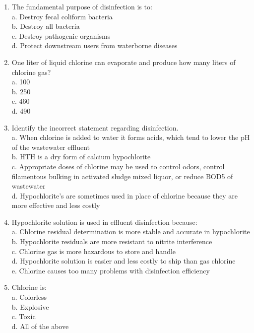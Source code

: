 \begin{tcolorbox}[breakable, enhanced,
colframe=blue!25,
colback=blue!10,
coltitle=blue!20!black,  
title= Chapter Assessment]
\begin{enumerate}
b. rotameter readings. \\
c. weighing of the cylinder or tank \\
d. the chlorine residual test . \\
e. None of the above. \\
\item The fundamental purpose of disinfection is to: \\
a. Destroy fecal coliform bacteria \\
b. Destroy all bacteria \\
c. Destroy pathogenic organisms \\
d. Protect downstream users from waterborne diseases \\
\item One liter of liquid chlorine can evaporate and produce how many liters of chlorine gas? \\
a. 100 \\
b. 250 \\
c. 460 \\
d. 490 \\
\item Identify the incorrect statement regarding disinfection. \\
a. When chlorine is added to water it forms acids, which tend to lower the pH of the wastewater effluent \\
b. HTH is a dry form of calcium hypochlorite \\
c. Appropriate doses of chlorine may be used to control odors, control filamentous bulking in activated sludge mixed liquor, or reduce BOD5 of wastewater \\
d. Hypochlorite’s are sometimes used in place of chlorine because they are more effective and less costly \\
\item Hypochlorite solution is used in effluent disinfection because: \\
a. Chlorine residual determination is more stable and accurate in hypochlorite \\
b. Hypochlorite residuals are more resistant to nitrite interference \\
c. Chlorine gas is more hazardous to store and handle \\
d. Hypochlorite solution is easier and less costly to ship than gas chlorine \\
e. Chlorine causes too many problems with disinfection efficiency \\
\item Chlorine is: \\
a. Colorless \\
b. Explosive \\
c. Toxic \\
d. All of the above \\
\end{enumerate}
\end{tcolorbox}
